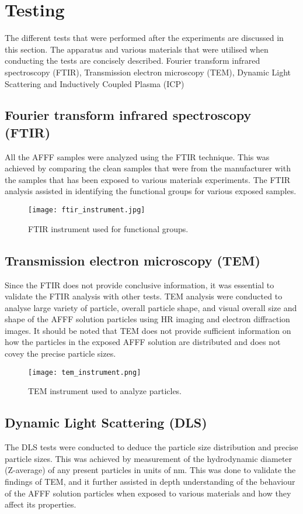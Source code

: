 \section{Testing} 
The different tests that were performed after the experiments are discussed in this section. The apparatus and various materials that were utilised when conducting the tests are concisely described. 
Fourier transform infrared spectroscopy (FTIR), Transmission electron microscopy (TEM), Dynamic Light Scattering and Inductively Coupled Plasma (ICP)

\subsection{Fourier transform infrared spectroscopy (FTIR)}
All the AFFF samples were analyzed using the FTIR technique. This was achieved by comparing the clean samples that were from the manufacturer with the samples that has been exposed to various materials experiments. The FTIR analysis assisted in identifying the functional groups for various exposed samples.
 
\begin{figure}[H]
    \texttt{[image: ftir\_instrument.jpg]}
    \caption{FTIR instrument used for functional groups.}
    \label{ch4:figure:ftir}
\end{figure}

\subsection{Transmission electron microscopy (TEM)}
Since the FTIR does not provide conclusive information, it was essential to validate the FTIR analysis with other tests. TEM analysis were conducted to analyse large variety of particle, overall particle shape, and visual overall size and shape of the AFFF solution particles using HR imaging and electron diffraction images. It should be noted that TEM does not provide sufficient information on how the particles in the exposed AFFF solution are distributed and does not covey the precise particle sizes. 
 
\begin{figure}[H]
    \texttt{[image: tem\_instrument.png]}
    \caption{TEM instrument used to analyze particles.}
    \label{ch4:figure:tem}
\end{figure}

\subsection{Dynamic Light Scattering (DLS)}
The DLS tests were conducted to deduce the particle size distribution and precise particle sizes. This was achieved by measurement of the hydrodynamic diameter (Z-average) of any present particles in units of nm. This was done to validate the findings of TEM, and it further assisted in depth understanding of the behaviour of the AFFF solution particles when exposed to various materials and how they affect its properties.  
 
